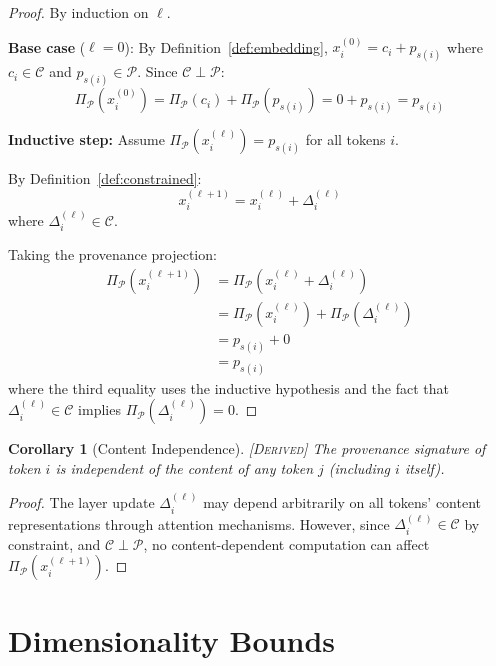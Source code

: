 \documentclass[11pt,a4paper]{article}
\theoremstyle{plain}
\newtheorem{corollary}[theorem]{Corollary}
\theoremstyle{definition}
\theoremstyle{remark}
\newcommand{\Cspace}{\mathcal{C}}
\newcommand{\Pspace}{\mathcal{P}}
\newcommand{\proj}[1]{\Pi_{#1}}
\newcommand{\derived}{\textsc{[Derived]}}
\begin{document}
\begin{proof}
By induction on $\ell$.

\textbf{Base case} ($\ell = 0$): By Definition~\ref{def:embedding}, $x_i^{(0)} = c_i + p_{s(i)}$ where $c_i \in \Cspace$ and $p_{s(i)} \in \Pspace$. Since $\Cspace \perp \Pspace$:
\begin{equation}
\proj{\Pspace}(x_i^{(0)}) = \proj{\Pspace}(c_i) + \proj{\Pspace}(p_{s(i)}) = 0 + p_{s(i)} = p_{s(i)}
\end{equation}

\textbf{Inductive step:} Assume $\proj{\Pspace}(x_i^{(\ell)}) = p_{s(i)}$ for all tokens $i$.

By Definition~\ref{def:constrained}:
\begin{equation}
x_i^{(\ell+1)} = x_i^{(\ell)} + \Delta_i^{(\ell)}
\end{equation}
where $\Delta_i^{(\ell)} \in \Cspace$.

Taking the provenance projection:
\begin{align}
\proj{\Pspace}(x_i^{(\ell+1)}) &= \proj{\Pspace}(x_i^{(\ell)} + \Delta_i^{(\ell)}) \\
&= \proj{\Pspace}(x_i^{(\ell)}) + \proj{\Pspace}(\Delta_i^{(\ell)}) \\
&= p_{s(i)} + 0 \\
&= p_{s(i)}
\end{align}
where the third equality uses the inductive hypothesis and the fact that $\Delta_i^{(\ell)} \in \Cspace$ implies $\proj{\Pspace}(\Delta_i^{(\ell)}) = 0$.
\end{proof}

\begin{corollary}[Content Independence] \label{cor:independence} \derived
The provenance signature of token $i$ is independent of the content of any token $j$ (including $i$ itself).
\end{corollary}

\begin{proof}
The layer update $\Delta_i^{(\ell)}$ may depend arbitrarily on all tokens' content representations through attention mechanisms. However, since $\Delta_i^{(\ell)} \in \Cspace$ by constraint, and $\Cspace \perp \Pspace$, no content-dependent computation can affect $\proj{\Pspace}(x_i^{(\ell+1)})$.
\end{proof}

\section{Dimensionality Bounds}
\end{document}

